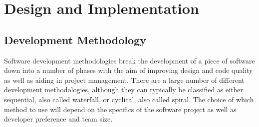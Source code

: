 \chapter{Design and Implementation}

\section{Development Methodology}
Software development methodologies break the development of a piece of software down into a number of phases with the aim of improving design and code quality as well as aiding in project management. There are a large number of different development methodologies, although they can typically be classified as either sequential, also called waterfall, or cyclical, also called spiral. The choice of which method to use will depend on the specifics of the software project as well as developer preference and team size.

